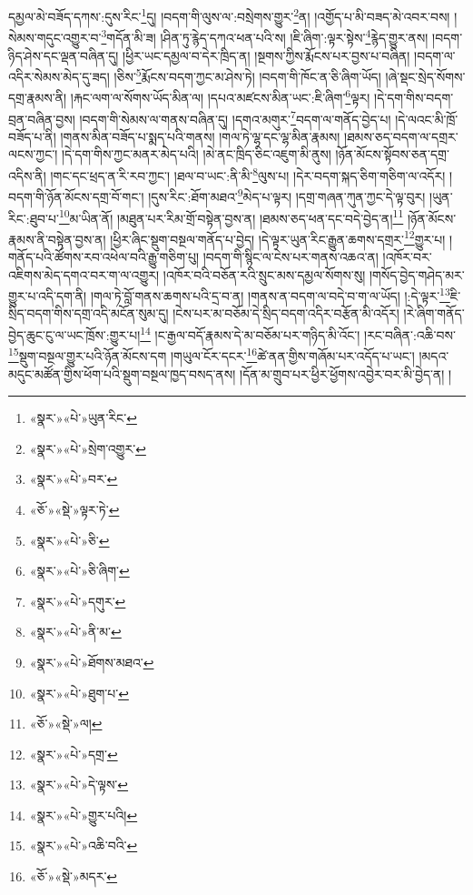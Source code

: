 དམྱལ་མེ་བཟོད་དཀས་:དུས་རིང་\footnote{«སྣར་»«པེ་»ཡུན་རིང་}དུ། །བདག་གི་ལུས་ལ་:བསྲེགས་གྱུར་\footnote{«སྣར་»«པེ་»སྲེག་འགྱུར་}ན། །འགྱོད་པ་མི་བཟད་མེ་འབར་བས། །སེམས་གདུང་འགྱུར་བ་\footnote{«སྣར་»«པེ་»བར་}གདོན་མི་ཟ། །ཤིན་ཏུ་རྙེད་དཀའ་ཕན་པའི་ས། །ཇི་ཞིག་:ལྟར་སྟེས་\footnote{«ཅོ་»«སྡེ་»ལྟར་ཏེ་}རྙེད་གྱུར་ནས། །བདག་ཉིད་ཤེས་དང་ལྡན་བཞིན་དུ། །ཕྱིར་ཡང་དམྱལ་བ་དེར་ཁྲིད་ན། །སྔགས་ཀྱིས་རྨོངས་པར་བྱས་པ་བཞིན། །བདག་ལ་འདིར་སེམས་མེད་དུ་ཟད། །ཅིས་\footnote{«སྣར་»«པེ་»ཅི་}རྨོངས་བདག་ཀྱང་མ་ཤེས་ཏེ། །བདག་གི་ཁོང་ན་ཅི་ཞིག་ཡོད། །ཞེ་སྡང་སྲེད་སོགས་དགྲ་རྣམས་ནི། །རྐང་ལག་ལ་སོགས་ཡོད་མིན་ལ། །དཔའ་མཛངས་མིན་ཡང་:ཇི་ཞིག་\footnote{«སྣར་»«པེ་»ཅི་ཞིག་}ལྟར། །དེ་དག་གིས་བདག་བྲན་བཞིན་བྱས། །བདག་གི་སེམས་ལ་གནས་བཞིན་དུ། །དགའ་མགུར་\footnote{«སྣར་»«པེ་»དགུར་}བདག་ལ་གནོད་བྱེད་པ། །དེ་ལའང་མི་ཁྲོ་བཟོད་པ་ནི། །གནས་མིན་བཟོད་པ་སྨད་པའི་གནས། །གལ་ཏེ་ལྷ་དང་ལྷ་མིན་རྣམས། །ཐམས་ཅད་བདག་ལ་དགྲར་ལངས་ཀྱང་། །དེ་དག་གིས་ཀྱང་མནར་མེད་པའི། །མེ་ནང་ཁྲིད་ཅིང་འཇུག་མི་ནུས། །ཉོན་མོངས་སྟོབས་ཅན་དགྲ་འདིས་ནི། །གང་དང་ཕྲད་ན་རི་རབ་ཀྱང་། །ཐལ་བ་ཡང་:ནི་མི་\footnote{«སྣར་»«པེ་»ནི་མ་}ལུས་པ། །དེར་བདག་སྐད་ཅིག་གཅིག་ལ་འདོར། །བདག་གི་ཉོན་མོངས་དགྲ་བོ་གང་། །དུས་རིང་:ཐོག་མཐའ་\footnote{«སྣར་»«པེ་»ཐོགས་མཐའ་}མེད་པ་ལྟར། །དགྲ་གཞན་ཀུན་ཀྱང་དེ་ལྟ་བུར། །ཡུན་རིང་:ཐུབ་པ་\footnote{«སྣར་»«པེ་»ཐུག་པ་}མ་ཡིན་ནོ། །མཐུན་པར་རིམ་གྲོ་བསྟེན་བྱས་ན། །ཐམས་ཅད་ཕན་དང་བདེ་བྱེད་ན།\footnote{«ཅོ་»«སྡེ་»ལ།} །ཉོན་མོངས་རྣམས་ནི་བསྟེན་བྱས་ན། །ཕྱིར་ཞིང་སྡུག་བསྔལ་གནོད་པ་བྱེད། །དེ་ལྟར་ཡུན་རིང་རྒྱུན་ཆགས་དགྲར་\footnote{«སྣར་»«པེ་»དགྲ་}གྱུར་པ། །གནོད་པའི་ཚོགས་རབ་འཕེལ་བའི་རྒྱུ་གཅིག་པུ། །བདག་གི་སྙིང་ལ་ངེས་པར་གནས་འཆའ་ན། །འཁོར་བར་འཇིགས་མེད་དགའ་བར་ག་ལ་འགྱུར། །འཁོར་བའི་བཅོན་རའི་སྲུང་མས་དམྱལ་སོགས་སུ། །གསོད་བྱེད་གཤེད་མར་གྱུར་པ་འདི་དག་ནི། །གལ་ཏེ་བློ་གནས་ཆགས་པའི་དྲ་བ་ན། །གནས་ན་བདག་ལ་བདེ་བ་ག་ལ་ཡོད། །:དེ་ལྟར་\footnote{«སྣར་»«པེ་»དེ་ལྟས་}ཇི་སྲིད་བདག་གིས་དགྲ་འདི་མངོན་སུམ་དུ། །ངེས་པར་མ་བཅོམ་དེ་སྲིད་བདག་འདིར་བརྩོན་མི་འདོར། །རེ་ཞིག་གནོད་བྱེད་ཆུང་ངུ་ལ་ཡང་ཁྲོས་:གྱུར་པ།\footnote{«སྣར་»«པེ་»གྱུར་པའི།} །ང་རྒྱལ་བདོ་རྣམས་དེ་མ་བཅོམ་པར་གཉིད་མི་འོང་། །རང་བཞིན་:འཆི་བས་\footnote{«སྣར་»«པེ་»འཆི་བའི་}སྡུག་བསྔལ་གྱུར་པའི་ཉོན་མོངས་དག །གཡུལ་ངོར་དངར་\footnote{«ཅོ་»«སྡེ་»མདར་}ཚེ་ནན་གྱིས་གཞོམ་པར་འདོད་པ་ཡང་། །མདའ་མདུང་མཚོན་གྱིས་ཕོག་པའི་སྡུག་བསྔལ་ཁྱད་བསད་ནས། །དོན་མ་གྲུབ་པར་ཕྱིར་ཕྱོགས་འབྱེར་བར་མི་བྱེད་ན། །
